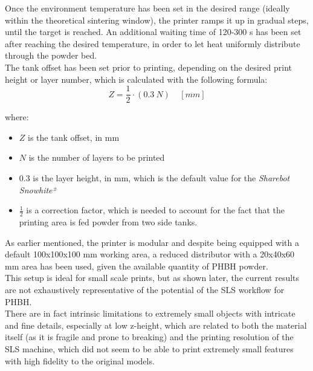 \documentclass{article}
\begin{document}
          Once the environment temperature has been set in the desired range (ideally within the theoretical 
          sintering window), the printer ramps it up in gradual steps, until the target is reached.  
          An additional waiting time of 120-300 s has been set after reaching the desired temperature, in order to let heat 
          uniformly distribute through the powder bed. \\
  
          The tank offset has been set prior to printing, depending on the desired print height or 
          layer number, which is calculated with the following formula: \\
          
          \begin{equation}
              Z =  \frac{1}{2} \cdot (0.3 \  N) \ \ \ \ \  [mm]
              \label{eq:layer_height}
          \end{equation}
          
          
          where:
          \begin{itemize}
              \item $Z$ is the tank offset, in mm
              \item $N$ is the number of layers to be printed 
              \item $0.3$ is the layer height, in mm, which is the default value for the \textit{Sharebot Snowhite²}
              \item $\frac{1}{2}$ is a correction factor, which is needed to account for the fact that the printing area is fed powder 
              from two side tanks.
          \end{itemize}

          As earlier mentioned, the printer is modular and despite being equipped 
          with a default 100x100x100 mm working area, a reduced distributor with a 20x40x60 mm area has been used, 
          given the available quantity of PHBH powder. \\ 
  
          This setup is ideal for small scale prints, but as shown later, the current results 
          are not exhaustively representative of the potential of the SLS workflow for PHBH. \\
  
          There are in fact intrinsic limitations to extremely small objects with intricate and fine details,
          especially at low z-height, which are related to both the material itself (as it is fragile and prone to 
          breaking) and the printing resolution of the SLS machine, which 
          did not seem to be able to print extremely small features with high fidelity to the original models. \\
  
\end{document}
